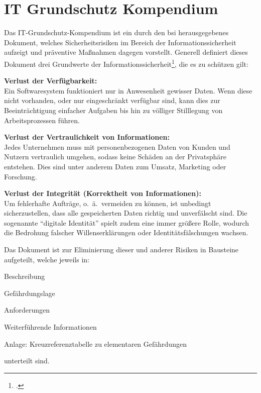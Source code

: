 \section{IT Grundschutz Kompendium}\label{sec:it-grundschutz-kompendium}

	Das IT-Grundschutz-Kompendium ist ein durch den \gls{bsi} herausgegebenes Dokument,
	welches Sicherheitsrisiken im Bereich der Informationssicherheit aufzeigt
	und präventive Maßnahmen dagegen vorstellt.
	Generell definiert dieses Dokument drei Grundwerte
	der Informationssicherheit\footcite[Vlg.][]{holgerschildt2022},
	die es zu schützen gilt:

	\begin{compactitem}
		\item[\textbf{Verlust der Verfügbarkeit:}]
		\label{itm:it-grundschutz-kompendium-verfügbarkeit}
		\mbox{}\\
		Ein Softwaresystem funktioniert nur in Anwesenheit gewisser Daten.
		Wenn diese nicht vorhanden,
		oder nur eingeschränkt verfügbar sind,
		kann dies zur Beeinträchtigung einfacher Aufgaben bis hin zu völliger Stilllegung von Arbeitsprozessen führen.

		\newpage

		\item[\textbf{Verlust der Vertraulichkeit von Informationen:}]
		\label{itm:it-grundschutz-kompendium-vertraulichkeit}
		\mbox{}\\
		Jedes Unternehmen muss mit personenbezogenen Daten von Kunden und Nutzern vertraulich umgehen,
		sodass keine Schäden an der Privatsphäre entstehen.
		Dies sind unter anderem Daten zum Umsatz, Marketing oder Forschung.

		\item[\textbf{Verlust der Integrität (Korrektheit von Informationen):}]
		\label{itm:it-grundschutz-kompendium-korrektheit}
		\mbox{}\\
		Um fehlerhafte Aufträge, o.\ ä.\ vermeiden zu können,
		ist unbedingt sicherzustellen,
		dass alle gespeicherten Daten richtig und unverfälscht sind.
		Die sogenannte \enquote{digitale Identität} spielt zudem eine immer größere Rolle,
		wodurch die Bedrohung falscher Willenserklärungen oder Identitätsfälschungen wachsen.

	\end{compactitem}

	Das Dokument ist zur Eliminierung dieser und anderer Risiken in Bausteine aufgeteilt,
	welche jeweils in:
	\begin{compactenum}
		\item Beschreibung
		\item Gefährdungslage
		\item Anforderungen
		\item Weiterführende Informationen
		\item Anlage: Kreuzreferenztabelle zu elementaren Gefährdungen
	\end{compactenum}
	unterteilt sind.

